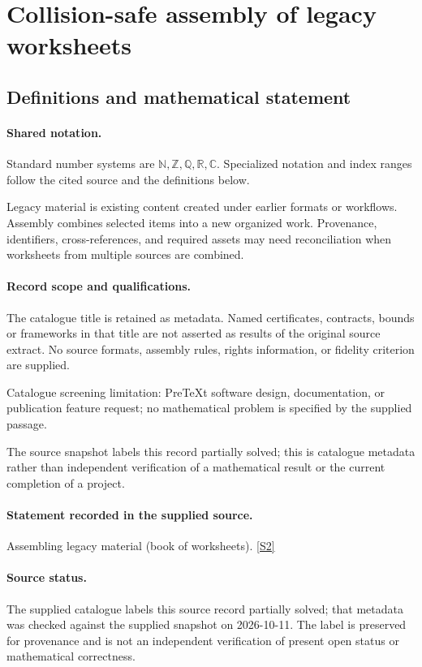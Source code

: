 \documentclass[11pt]{article}
\newcommand{\sref}[2]{\hyperlink{source:#1:#2}{[S#2]}}
\begin{document}
\section{Collision-safe assembly of legacy worksheets}\label{statement}

\subsection{Definitions and mathematical statement}

\paragraph{Shared notation.}Standard number systems are $\mathbb N,\mathbb Z,\mathbb Q,\mathbb R,\mathbb C$. Specialized notation and index ranges follow the cited source and the definitions below.


Legacy material is existing content created under earlier formats or workflows. Assembly combines selected items into a new organized work. Provenance, identifiers, cross-references, and required assets may need reconciliation when worksheets from multiple sources are combined.
\paragraph{Record scope and qualifications.}
The catalogue title is retained as metadata. Named certificates, contracts, bounds or frameworks in that title are not asserted as results of the original source extract.
No source formats, assembly rules, rights information, or fidelity criterion are supplied.

Catalogue screening limitation: PreTeXt software design, documentation, or publication feature request; no mathematical problem is specified by the supplied passage.

The source snapshot labels this record partially solved; this is catalogue metadata rather than independent verification of a mathematical result or the current completion of a project.
\paragraph{Statement recorded in the supplied source.}
Assembling legacy material (book of worksheets). \sref{statement}{2}
\paragraph{Source status.}
The supplied catalogue labels this source record partially solved; that metadata was checked against the supplied snapshot on 2026-10-11. The label is preserved for provenance and is not an independent verification of present open status or mathematical correctness.
\end{document}
